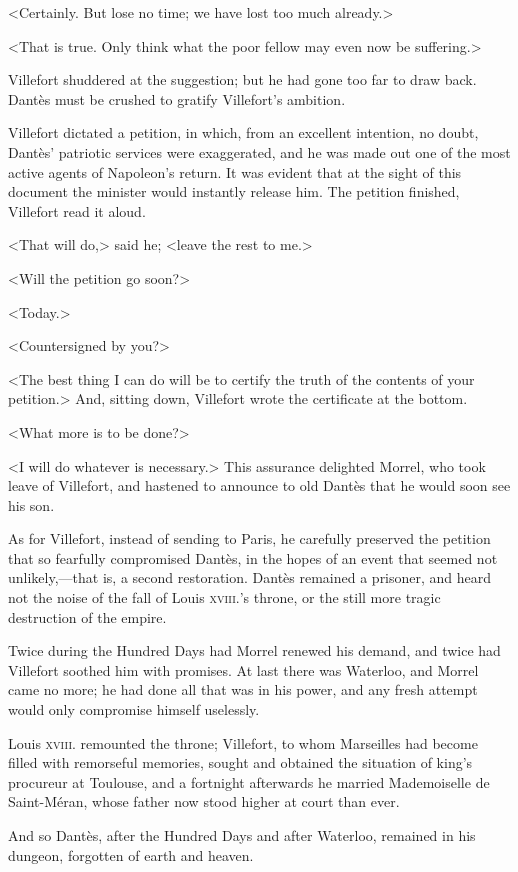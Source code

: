  <Certainly. But lose no time; we have lost too much already.> 

 <That is true. Only think what the poor fellow may even now be suffering.> 

 Villefort shuddered at the suggestion; but he had gone too far to draw back. Dantès must be crushed to gratify Villefort's ambition. 

 Villefort dictated a petition, in which, from an excellent intention, no doubt, Dantès' patriotic services were exaggerated, and he was made out one of the most active agents of Napoleon's return. It was evident that at the sight of this document the minister would instantly release him. The petition finished, Villefort read it aloud. 

 <That will do,> said he; <leave the rest to me.> 

 <Will the petition go soon?> 

 <Today.> 

 <Countersigned by you?> 

 <The best thing I can do will be to certify the truth of the contents of your petition.> And, sitting down, Villefort wrote the certificate at the bottom. 

 <What more is to be done?> 

 <I will do whatever is necessary.> This assurance delighted Morrel, who took leave of Villefort, and hastened to announce to old Dantès that he would soon see his son. 

 As for Villefort, instead of sending to Paris, he carefully preserved the petition that so fearfully compromised Dantès, in the hopes of an event that seemed not unlikely,—that is, a second restoration. Dantès remained a prisoner, and heard not the noise of the fall of Louis \textsc{xviii.}'s throne, or the still more tragic destruction of the empire. 

 Twice during the Hundred Days had Morrel renewed his demand, and twice had Villefort soothed him with promises. At last there was Waterloo, and Morrel came no more; he had done all that was in his power, and any fresh attempt would only compromise himself uselessly. 

 Louis \textsc{xviii.} remounted the throne; Villefort, to whom Marseilles had become filled with remorseful memories, sought and obtained the situation of king's procureur at Toulouse, and a fortnight afterwards he married Mademoiselle de Saint-Méran, whose father now stood higher at court than ever. 

 And so Dantès, after the Hundred Days and after Waterloo, remained in his dungeon, forgotten of earth and heaven. 

